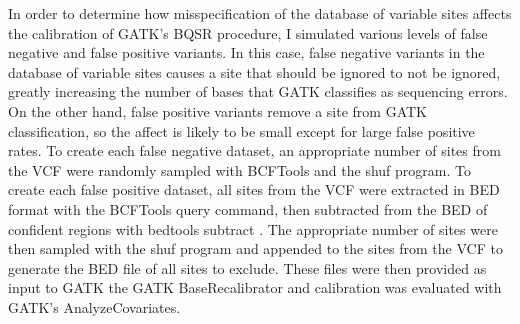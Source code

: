 \documentclass{article}
\begin{document}
\begin{outline}
\begin{outline}
		\item In order to determine how misspecification of the database of variable sites affects the calibration of GATK's BQSR procedure, I simulated various levels of false negative and false positive variants. In this case, false negative variants in the database of variable sites causes a site that should be ignored to not be ignored, greatly increasing the number of bases that GATK classifies as sequencing errors. On the other hand, false positive variants remove a site from GATK classification, so the affect is likely to be small except for large false positive rates. To create each false negative dataset, an appropriate number of sites from the VCF were randomly sampled with BCFTools and the shuf program. To create each false positive dataset, all sites from the VCF were extracted in BED format with the BCFTools query command, then subtracted from the BED of confident regions with bedtools subtract \parencite{quinlan_bedtools_2010}. The appropriate number of sites were then sampled with the shuf program and appended to the sites from the VCF to generate the BED file of all sites to exclude. These files were then provided as input to GATK the GATK BaseRecalibrator and calibration was evaluated with GATK's AnalyzeCovariates.
	\end{outline}
\end{outline}
\end{document}
